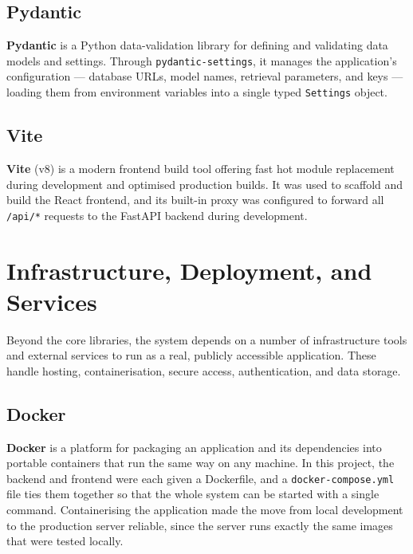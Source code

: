 \subsection{Pydantic}
\textbf{Pydantic} is a Python data-validation library for defining and validating data
models and settings. Through \texttt{pydantic-settings}, it manages the application's
configuration — database URLs, model names, retrieval parameters, and keys — loading them
from environment variables into a single typed \texttt{Settings} object.

\subsection{Vite}
\textbf{Vite} (v8) is a modern frontend build tool offering fast hot module replacement
during development and optimised production builds. It was used to scaffold and build the
React frontend, and its built-in proxy was configured to forward all \texttt{/api/*}
requests to the FastAPI backend during development.

\newpage
\section{Infrastructure, Deployment, and Services}

\hs Beyond the core libraries, the system depends on a number of infrastructure tools
and external services to run as a real, publicly accessible application. These handle
hosting, containerisation, secure access, authentication, and data storage.

\subsection{Docker}
\textbf{Docker} is a platform for packaging an application and its dependencies into
portable containers that run the same way on any machine. In this project, the backend
and frontend were each given a Dockerfile, and a \texttt{docker-compose.yml} file ties
them together so that the whole system can be started with a single command. Containerising
the application made the move from local development to the production server reliable,
since the server runs exactly the same images that were tested locally.


